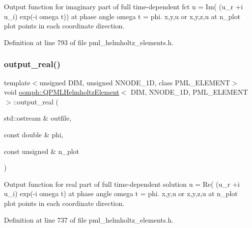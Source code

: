 Output function for imaginary part of full time-\/dependent fct u = Im( (u\+\_\+r +i u\+\_\+i) exp(-\/i omega t)) at phase angle omega t = phi. x,y,u or x,y,z,u at n\+\_\+plot plot points in each coordinate direction. 



Definition at line 793 of file pml\+\_\+helmholtz\+\_\+elements.\+h.

\mbox{\label{classoomph_1_1QPMLHelmholtzElement_ab530ee839ec7ad0d1e4fdaf8d6e3619e}} 
\subsubsection{\texorpdfstring{output\+\_\+real()}{output\_real()}}
{\footnotesize\ttfamily template$<$unsigned D\+IM, unsigned N\+N\+O\+D\+E\+\_\+1D, class P\+M\+L\+\_\+\+E\+L\+E\+M\+E\+NT$>$ \\
void \hyperlink{classoomph_1_1QPMLHelmholtzElement}{oomph\+::\+Q\+P\+M\+L\+Helmholtz\+Element}$<$ D\+IM, N\+N\+O\+D\+E\+\_\+1D, P\+M\+L\+\_\+\+E\+L\+E\+M\+E\+NT $>$\+::output\+\_\+real (\begin{DoxyParamCaption}\item[{std\+::ostream \&}]{outfile,  }\item[{const double \&}]{phi,  }\item[{const unsigned \&}]{n\+\_\+plot }\end{DoxyParamCaption})\hspace{0.3cm}{\ttfamily [inline]}}



Output function for real part of full time-\/dependent solution u = Re( (u\+\_\+r +i u\+\_\+i) exp(-\/i omega t) at phase angle omega t = phi. x,y,u or x,y,z,u at n\+\_\+plot plot points in each coordinate direction. 



Definition at line 737 of file pml\+\_\+helmholtz\+\_\+elements.\+h.

\mbox{\label{classoomph_1_1QPMLHelmholtzElement_aeb5ace5d9ef5af956d7d41bce732df70}} 
